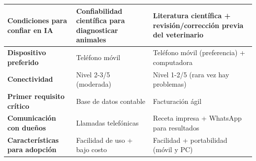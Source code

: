 \documentclass[
]{article}
\newcounter{none} %
\begin{document}
{\def\LTcaptype{none} %
\begin{longtable}[]{@{}
  >{\raggedright\arraybackslash}p{}
  >{\raggedright\arraybackslash}p{}
  >{\raggedright\arraybackslash}p{}@{}}
\toprule\noalign{}
\begin{minipage}[b]{\linewidth}\raggedright
\textbf{Condiciones para confiar en IA}
\end{minipage} & \begin{minipage}[b]{\linewidth}\raggedright
Confiabilidad científica para diagnosticar animales
\end{minipage} & \begin{minipage}[b]{\linewidth}\raggedright
Literatura científica + revisión/corrección previa del veterinario
\end{minipage} \\
\midrule\noalign{}
\endhead
\bottomrule\noalign{}
\endlastfoot
\textbf{Dispositivo preferido} &
\begin{minipage}[t]{\linewidth}\raggedright
Teléfono móvil
\end{minipage} & \begin{minipage}[t]{\linewidth}\raggedright
Teléfono móvil (preferencia) + computadora
\end{minipage} \\
\textbf{Conectividad} & \begin{minipage}[t]{\linewidth}\raggedright
Nivel 2-3/5 (moderada)
\end{minipage} & \begin{minipage}[t]{\linewidth}\raggedright
Nivel 1-2/5 (rara vez hay problemas)
\end{minipage} \\
\textbf{Primer requisito crítico} &
\begin{minipage}[t]{\linewidth}\raggedright
Base de datos contable
\end{minipage} & \begin{minipage}[t]{\linewidth}\raggedright
Facturación ágil
\end{minipage} \\
\textbf{Comunicación con dueños} &
\begin{minipage}[t]{\linewidth}\raggedright
Llamadas telefónicas
\end{minipage} & \begin{minipage}[t]{\linewidth}\raggedright
Receta impresa + WhatsApp para resultados
\end{minipage} \\
\textbf{Características para adopción} &
\begin{minipage}[t]{\linewidth}\raggedright
Facilidad de uso + bajo costo
\end{minipage} & \begin{minipage}[t]{\linewidth}\raggedright
Facilidad + portabilidad (móvil y PC)
\end{minipage} \\
\end{longtable}
}
\end{document}
